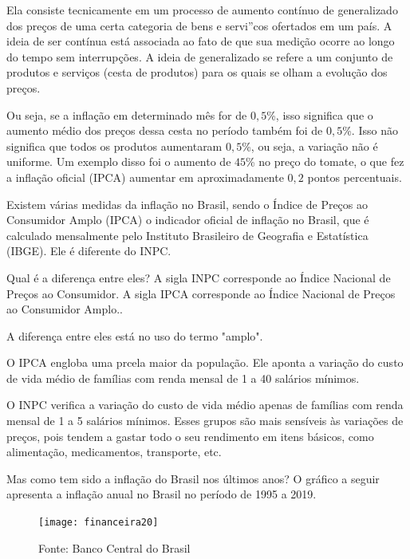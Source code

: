 Ela consiste tecnicamente em um processo de aumento contínuo de generalizado dos preços de uma certa categoria de bens e servi''cos ofertados em um país. A ideia de ser contínua está associada ao fato de que sua medição ocorre ao longo do tempo sem interrupções. A ideia de generalizado se refere a um conjunto de produtos e serviços (cesta de produtos) para os quais se olham a evolução dos preços.

 Ou seja, se a inflação em determinado mês for de $0{,}5$\%, isso significa que o aumento médio dos preços dessa cesta no período também foi de $0,5$\%. Isso não significa que todos os produtos aumentaram $0{,}5$\%, ou seja, a variação não é uniforme. Um exemplo disso foi o aumento de $45$\% no preço do tomate, o que fez a inflação oficial (IPCA) aumentar em aproximadamente $0{,}2$ pontos percentuais.

 Existem várias medidas da inflação no Brasil, sendo o Índice de Preços ao Consumidor Amplo (IPCA) o indicador oficial de inflação no Brasil, que é calculado mensalmente pelo Instituto Brasileiro de Geografia e Estatística (IBGE). Ele é diferente do INPC.

\begin{observation}{Qual é a diferença entre eles?}
A sigla INPC corresponde ao Índice Nacional de Preços ao Consumidor. A sigla IPCA corresponde ao Índice Nacional de Preços ao Consumidor Amplo..

A diferença entre eles está no uso do termo "amplo".

O IPCA engloba uma prcela maior da população. Ele aponta a variação do custo de vida médio de famílias com renda mensal de 1 a 40 salários mínimos.

O INPC verifica a variação do custo de vida médio apenas de famílias com renda mensal de 1 a 5 salários mínimos. Esses grupos são mais sensíveis às variações de preços, pois tendem a gastar todo o seu rendimento em itens básicos, como alimentação, medicamentos, transporte, etc.
\end{observation}

Mas como tem sido a inflação do Brasil nos últimos anos? O gráfico a seguir apresenta a inflação anual no Brasil no período de 1995 a 2019.

\begin{figure}[H]
\centering

\texttt{[image: financeira20]}

\caption{Fonte: Banco Central do Brasil}
\end{figure}

